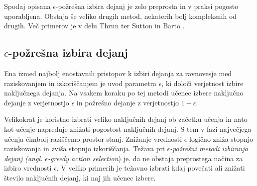 \documentclass[a4paper, oneside, 12pt]{report}
\begin{document}
Spodaj opisana $\epsilon$-požrešna izbira dejanj je zelo preprosta in v praksi pogosto uporabljena. Obstaja še veliko drugih metod, nekaterih bolj kompleksnih od drugih. Več primerov je v delu Thrun \cite{TheRoleOfExplorationInLearningControl} ter Sutton in Barto \cite{ReinforcementLearningAnIntroduction}.

\subsection{$\epsilon$-požrešna izbira dejanj}
Ena izmed najbolj enostavnih pristopov k izbiri dejanja za ravnovesje med raziskovanjem in izkoriščanjem je uvod parametra $\epsilon$, ki določi verjetnost izbire naključnega dejanja. Na vsakem koraku po tej metodi učenec izbere naključno dejanje z verjetnostjo $\epsilon$ in požrešno dejanje z verjetnostjo $1 - \epsilon$.

Velikokrat je koristno izbrati veliko naključnih dejanj ob začetku učenja in nato kot učenje napreduje znižati pogostost naključnih dejanj. S tem v fazi največjega učenja čimbolj raziščemo prostor stanj. Znižanje vrednosti $\epsilon$ logično zniža stopnjo raziskovanja in zviša stopnjo izkoriščanja. Težava pri {\em $\epsilon$-požrešni metodi izbiranja dejanj (angl. $\epsilon$-greedy action selection}) je, da ne obstaja preprostega načina za izbiro vrednosti $\epsilon$. V veliko primerih je težavno izbrati kdaj povečati ali znižati število naključnih dejanj, ki naj jih učenec izbere.




\end{document}
